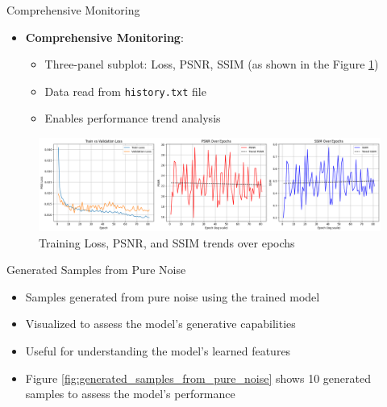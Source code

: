 \begin{frame}{Comprehensive Monitoring}
    \begin{itemize}
        \item \textbf{Comprehensive Monitoring}:
              \begin{itemize}
                  \item Three-panel subplot: Loss, PSNR, SSIM (as shown in the Figure \ref{fig:training_results})
                  \item Data read from \texttt{history.txt} file
                  \item Enables performance trend analysis
              \end{itemize}
    \end{itemize}
    \begin{figure}
        \centering
        \includegraphics[width=1.0\textwidth]{media/training_results.png}
        \caption{Training Loss, PSNR, and SSIM trends over epochs}
        \label{fig:training_results}
    \end{figure}
\end{frame}

\begin{frame}{Generated Samples from Pure Noise}
    \begin{itemize}
        \item Samples generated from pure noise using the trained model
        \item Visualized to assess the model's generative capabilities
        \item Useful for understanding the model's learned features
        \item Figure \ref{fig:generated_samples_from_pure_noise} shows 10 generated samples to assess the model's performance
    \end{itemize}
\end{frame}

